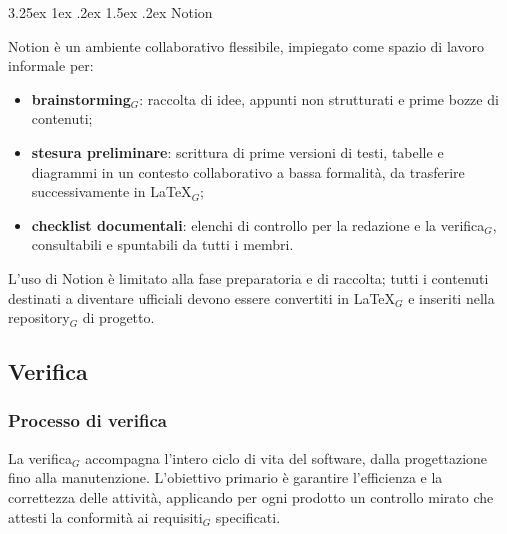 \documentclass[a4paper, 10pt]{article}
\makeatletter
\renewcommand\paragraph{\@startsection{paragraph}{4}{\z@}%
  {3.25ex \@plus1ex \@minus .2ex}%
  {1.5ex \@plus .2ex}%
  {\normalfont\normalsize\bfseries}}
\makeatother
\begin{document}
\paragraph{Notion}

Notion è un ambiente collaborativo flessibile, impiegato come spazio di lavoro informale per:
\begin{itemize}
    \item \textbf{brainstorming$_G$}: raccolta di idee, appunti non strutturati e prime bozze di contenuti;
    \item \textbf{stesura preliminare}: scrittura di prime versioni di testi, tabelle e diagrammi in un contesto collaborativo a bassa formalità, da trasferire successivamente in \LaTeX$_G$;
    \item \textbf{checklist documentali}: elenchi di controllo per la redazione e la verifica$_G$, consultabili e spuntabili da tutti i membri.
\end{itemize}

L'uso di Notion è limitato alla fase preparatoria e di raccolta; tutti i contenuti destinati a diventare ufficiali devono essere convertiti in \LaTeX$_G$ e inseriti nella repository$_G$ di progetto.

\subsection{Verifica}
\label{subsec:verifica}

\subsubsection{Processo di verifica}

La verifica$_G$ accompagna l'intero ciclo di vita del software, dalla progettazione fino alla manutenzione. L'obiettivo primario è garantire l'efficienza e la correttezza delle attività, applicando per ogni prodotto un controllo mirato che attesti la conformità ai requisiti$_G$ specificati.
\end{document}
